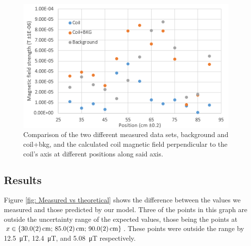 \begin{figure}[H]    \centering
    \includegraphics[width = \linewidth]{figures/perpendicular_sets_graph_revised.png}
    \caption{Comparison of the two different measured data sets, background and coil+bkg, and the calculated coil magnetic field perpendicular to the coil's axis at different positions along said axis.}
    \label{fig: Perpendicular sets graph}
\end{figure}

\vspace{1cm}
\subsection{Results}
Figure \ref{fig: Measured vs theoretical} shows the difference between the values we measured and those predicted by our model. Three of the points in this graph are outside the uncertainty range of the expected values, those being the points at $x\in\{\SI{30 \pm 0.2}{\centi\metre};\, \SI{85 \pm 0.2}{\centi\metre};\, \SI{90 \pm 0.2}{\centi\metre}\}$. These points were outside the range by \SI{12.5}{\micro\tesla}, \SI{12.4}{\micro\tesla}, and \SI{5.08}{\micro\tesla} respectively.